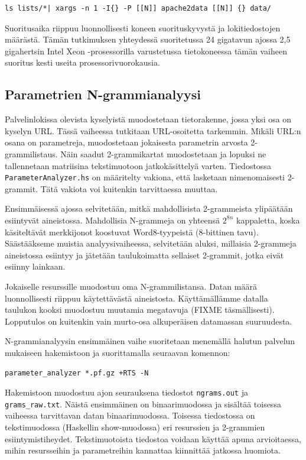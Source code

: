 \begin{lstlisting}[language=bashshell]
ls lists/*| xargs -n 1 -I{} -P [[N]] apache2data [[N]] {} data/
\end{lstlisting}

Suoritusaika riippuu luonnollisesti koneen suorituskyvystä ja
lokitiedostojen määrästä. Tämän tutkimuksen yhteydessä suoritetussa 24
gigatavun ajossa 2,5 gigahertsin Intel Xeon -prosessorilla varustetussa
tietokoneessa tämän vaiheen suoritus kesti useita
prosessorivuorokausia.

\subsection{Parametrien N-grammianalyysi}

Palvelinlokissa olevista kyselyistä muodostetaan tietorakenne, jossa
yksi osa on kyselyn URL. Tässä vaiheessa tutkitaan URL-osoitetta
tarkemmin. Mikäli URL:n osana on parametreja, muodostetaan jokaisesta
parametrin arvosta 2-grammilistaus. Näin saadut 2-grammikartat
muodostetaan ja lopuksi ne tallennetaan matriisina tekstimuotoon
jatkokäsittelyä varten. Tiedostossa \texttt{ParameterAnalyzer.hs} on
määritelty vakiona, että lasketaan nimenomaisesti 2-grammit. Tätä
vakiota voi kuitenkin tarvittaessa muuttaa.

Ensimmäisessä ajossa selvitetään, mitkä mahdollisista 2-grammeista
ylipäätään esiintyvät aineistossa. Mahdollisia N-grammeja on yhteensä
$2^{8n}$ kappaletta, koska käsiteltävät merkkijonot koostuvat
Word8-tyypeistä (8-bittinen tavu). Säästääkseme muistia
analyysivaiheessa, selvitetään aluksi, millaisia 2-grammeja
aineistossa esiintyy ja jätetään taulukoimatta sellaiset 2-grammit,
jotka eivät esiinny lainkaan.

Jokaiselle resurssille muodostuu oma N-grammilistansa. Datan määrä
luonnollisesti riippuu käytettävästä aineistosta. Käyttämällämme
datalla taulukon kooksi muodostuu muutamia megatavuja (FIXME täsmällisesti).
Lopputulos on kuitenkin vain murto-osa alkuperäisen datamassan
suuruudesta.

N-grammianalyysin ensimmäinen vaihe suoritetaan menemällä halutun
palvelun mukaiseen hakemistoon ja suorittamalla seuraavan komennon:

\begin{lstlisting}[language=bashshell]
parameter_analyzer *.pf.gz +RTS -N
\end{lstlisting} 

Hakemistoon muodostuu ajon seurauksena tiedostot \texttt{ngrams.out}
ja \texttt{grams\_raw.txt}. Näistä ensimmäinen on binaarimuodossa ja
sisältää toisessa vaiheessa tarvittavan datan
binaarimuodossa. Toisessa tiedostossa on tekstimuodossa (Haskellin
show-muodossa) eri resurssien ja 2-grammien
esiintymistiheydet. Tekstimuotoista tiedostoa voidaan käyttää apuna
arvioitaessa, mihin resursseihin ja parametreihin kannattaa kiinnittää
jatkossa huomiota.


